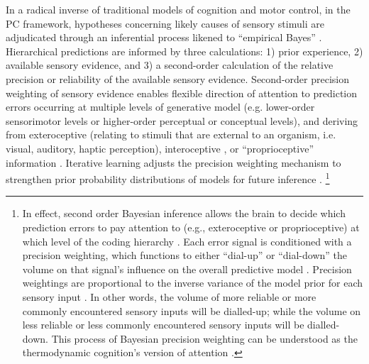 \begin{CJK}{UTF8}{gbsn}
In a radical inverse of traditional models of cognition and motor control, in the PC framework, hypotheses concerning likely causes of sensory stimuli are adjudicated through an inferential process likened to ``empirical Bayes'' \citep{Clark2013}.  Hierarchical predictions are informed by three calculations: 1) prior experience, 2) available sensory evidence, and 3) a second-order calculation of the relative precision or reliability of the available sensory evidence.  Second-order precision weighting of sensory evidence enables flexible direction of attention to prediction errors occurring at multiple levels of generative model (e.g. lower-order sensorimotor levels or higher-order perceptual or conceptual levels), and deriving from exteroceptive (relating to stimuli that are external to an organism, i.e. visual, auditory, haptic perception), interoceptive \citep[relating to stimuli produced within an organism, particularly by the body's organs (viscera) e.g., ``gut feelings,'' or elevated heart rate; see][]{Seth2013,FeldmanBarrett2015}, or ``proprioceptive'' information \citep[relating to stimuli that are produced and perceived within an organism, especially those connected with the position and movement of the body][]{Friston2011a}.  Iterative learning adjusts the precision weighting mechanism to strengthen prior probability distributions of models for future inference \citep{Robbins1964}.
    \footnote{In effect, second order Bayesian inference allows the brain to decide which prediction errors to pay attention to (e.g., exteroceptive or proprioceptive) at which level of the coding hierarchy \citep[for example, high and conceptual or deep and sensory][]{Friston2015}.  Each error signal is conditioned with a precision weighting, which functions to either ``dial-up'' or ``dial-down'' the volume on that signal's influence on the overall predictive model \citep{Clark2015}.  Precision weightings are proportional to the inverse variance of the model prior for each sensory input \citep{Ernst2004,FitzGerald2014}.  In other words, the volume of more reliable or more commonly encountered sensory inputs will be dialled-up; while the volume on less reliable or less commonly encountered sensory inputs will be dialled-down. This process of Bayesian precision weighting can be understood as the thermodynamic cognition's version of attention \citep{Ramstead2016}.}


\end{CJK}
